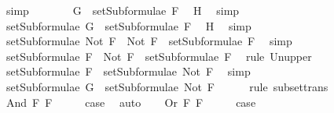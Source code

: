 \begin{isabellebody}
\ simp\isanewline
\ \ \ \ \isamarkupfalse%
\ \isamarkupfalse%
\ {\isachardoublequoteopen}G\ {\isasymin}\ setSubformulae\ F{\isachardoublequoteclose}\ \isamarkupfalse%
\ H{}\ \isamarkupfalse%
\ simp\isanewline
\ \ \ \ \isamarkupfalse%
\ \isamarkupfalse%
\ {}{\isacharcolon}{\isachardoublequoteopen}setSubformulae\ G\ {\isasymsubseteq}\ setSubformulae\ F{\isachardoublequoteclose}\ \isamarkupfalse%
\ H{}\ \isamarkupfalse%
\ simp\isanewline
\ \ \ \ \isamarkupfalse%
\ {\isachardoublequoteopen}setSubformulae\ {\isacharparenleft}Not\ F{\isacharparenright}\ {\isacharequal}\ {\isacharbraceleft}Not\ F{\isacharbraceright}\ {\isasymunion}\ setSubformulae\ F{\isachardoublequoteclose}\ \isamarkupfalse%
\ simp\isanewline
\ \ \ \ \isamarkupfalse%
\ {\isachardoublequoteopen}setSubformulae\ F\ {\isasymsubseteq}\ {\isacharbraceleft}Not\ F{\isacharbraceright}\ {\isasymunion}\ setSubformulae\ F{\isachardoublequoteclose}\ \isamarkupfalse%
\ {\isacharparenleft}rule\ Un{\isacharunderscore}upper{}{\isacharparenright}\isanewline
\ \ \ \ \isamarkupfalse%
\ \isamarkupfalse%
\ {}{\isacharcolon}{\isachardoublequoteopen}setSubformulae\ F\ {\isasymsubseteq}\ setSubformulae\ {\isacharparenleft}Not\ F{\isacharparenright}{\isachardoublequoteclose}\ \isamarkupfalse%
\ simp\isanewline
\ \ \ \ \isamarkupfalse%
\ {\isachardoublequoteopen}setSubformulae\ G\ {\isasymsubseteq}\ setSubformulae\ {\isacharparenleft}Not\ F{\isacharparenright}{\isachardoublequoteclose}\ \isamarkupfalse%
\ {}\ {}\ \isamarkupfalse%
\ {\isacharparenleft}rule\ subset{\isacharunderscore}trans{\isacharparenright}\isanewline
\ \ \isamarkupfalse%
\isanewline
{}\isamarkupfalse%
\isanewline
\ \ \isamarkupfalse%
\ {\isacharparenleft}And\ F{}\ F{}{\isacharparenright}\isanewline
\ \ \isamarkupfalse%
\ \isamarkupfalse%
\ {\isacharquery}case\ \isamarkupfalse%
\ auto\isanewline
{}\isamarkupfalse%
\isanewline
\ \ \isamarkupfalse%
\ {\isacharparenleft}Or\ F{}\ F{}{\isacharparenright}\isanewline
\ \ \isamarkupfalse%
\ \isamarkupfalse%
\ {\isacharquery}case\ \isamarkupfalse%

\end{isabellebody}
